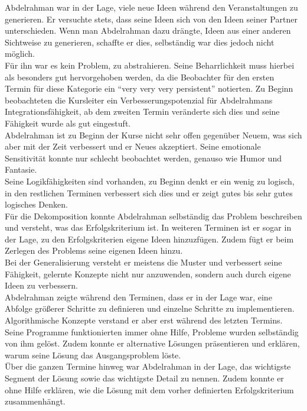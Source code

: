Abdelrahman war in der Lage, viele neue Ideen während den Veranstaltungen zu generieren. Er versuchte stets, dass seine Ideen sich von den Ideen seiner Partner unterschieden. Wenn man Abdelrahman dazu drängte, Ideen aus einer anderen Sichtweise zu generieren, schaffte er dies, selbständig war dies jedoch nicht möglich.\\
Für ihn war es kein Problem, zu abstrahieren. Seine Beharrlichkeit muss hierbei als besonders gut hervorgehoben werden, da die Beobachter für den ersten Termin für diese Kategorie ein "`very very very persistent"' notierten. Zu Beginn beobachteten die Kursleiter ein Verbesserungspotenzial für Abdelrahmans Integrationsfähigkeit, ab dem zweiten Termin veränderte sich dies und seine Fähigkeit wurde als gut eingestuft.\\
Abdelrahman ist zu Beginn der Kurse nicht sehr offen gegenüber Neuem, was sich aber mit der Zeit verbessert und er Neues akzeptiert. Seine emotionale Sensitivität konnte nur schlecht beobachtet werden, genauso wie Humor und Fantasie.\\
Seine Logikfähigkeiten sind vorhanden, zu Beginn denkt er ein wenig zu logisch, in den restlichen Terminen verbessert sich dies und er zeigt gutes bis sehr gutes logisches Denken.\\ 

Für die Dekomposition konnte Abdelrahman selbständig das Problem beschreiben und versteht, was das Erfolgskriterium ist. In weiteren Terminen ist er sogar in der Lage, zu den Erfolgskriterien eigene Ideen hinzuzfügen. Zudem fügt er beim Zerlegen des Problems seine eigenen Ideen hinzu.\\
Bei der Generalisierung versteht er meistens die Muster und verbessert seine Fähigkeit, gelernte Konzepte nicht nur anzuwenden, sondern auch durch eigene Ideen zu verbessern.\\
Abdelrahman zeigte während den Terminen, dass er in der Lage war, eine Abfolge größerer Schritte zu definieren und einzelne Schritte zu implementieren. Algorithmische Konzepte verstand er aber erst während des letzten Termins.\\
Seine Programme funktionierten immer ohne Hilfe, Probleme wurden selbständig von ihm gelöst. Zudem konnte er alternative Lösungen präsentieren und erklären, warum seine Lösung das Ausgangsproblem löste.\\
Über die ganzen Termine hinweg war Abdelrahman in der Lage, das wichtigste Segment der Lösung sowie das wichtigste Detail zu nennen. Zudem konnte er ohne Hilfe erklären, wie die Lösung mit dem vorher definierten Erfolgskriterium zusammenhängt.\\

